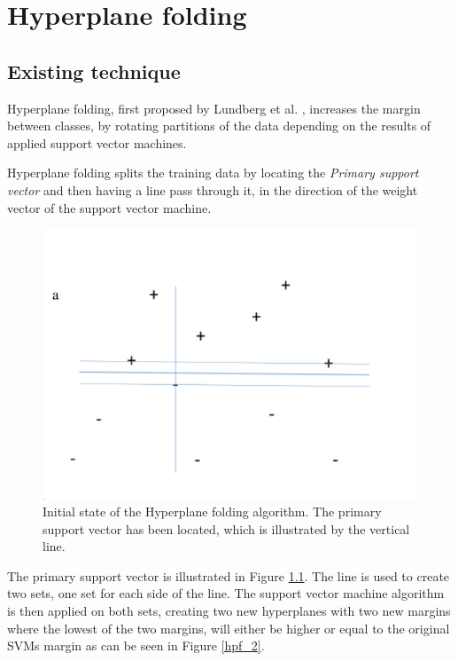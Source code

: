 \documentclass[a4paper,twoside]{bth}
\begin{document}
\chapter{Hyperplane folding}

\section{Existing technique}

\par Hyperplane folding, first proposed by Lundberg et al. \cite{unpublished}, increases the margin between classes, by rotating partitions of the data depending on the results of applied support vector machines. 
\par Hyperplane folding splits the training data by locating the \textit{Primary support vector} \cite{unpublished} and then having a line pass through it, in the direction of the weight vector of the support vector machine.
\begin{figure}
\centering
\includegraphics[scale=0.7]{images/intro-images/hpf_1.png}
   \caption{Initial state of the Hyperplane folding algorithm. The primary support vector has been located, which is illustrated by the vertical line.}
   \label{hpf_1}
\end{figure} 
The primary support vector is illustrated in Figure \ref{hpf_1}. The line is used to create two sets, one set for each side of the line. The support vector machine algorithm is then applied on both sets, creating two new hyperplanes with two new margins where the lowest of the two margins, will either be higher or equal to the original SVMs margin \cite{unpublished} as can be seen in Figure \ref{hpf_2}.
\end{document}
